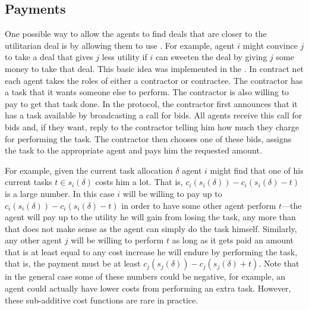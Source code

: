 \subsection{Payments}
\label{sec:payments}

One possible way to allow the agents to find deals that are closer to
the utilitarian deal is by allowing them to use .  For example, agent $i$ might convince $j$ to take a deal
that gives $j$ less utility if $i$ can sweeten the deal by giving $j$
some money to take that deal. This basic idea was implemented in the
 \cite{smith81,davis83a}. In contract net
each agent takes the roles of either a contractor or contractee. The
contractor has a task that it wants someone else to perform. The
contractor is also willing to pay to get that task done. In the
protocol, the contractor first announces that it has a task available
by broadcasting a call for bids. All agents receive this call for bids
and, if they want, reply to the contractor telling him how much they
charge for performing the task. The contractor then chooses one of
these bids, assigns the task to the appropriate agent and pays him the
requested amount.

For example, given the current task allocation $\delta$ agent $i$
might find that one of his current tasks $t \in s_i(\delta)$ costs him
a lot. That is, $c_i(s_i(\delta)) - c_i(s_i(\delta) - t)$ is a large
number. In this case $i$ will be willing to pay up to
$c_i(s_i(\delta)) - c_i(s_i(\delta) - t)$ in order to have some other
agent perform $t$---the agent will pay up to the utility he will gain
from losing the task, any more than that does not make sense as the
agent can simply do the task himself. Similarly, any other agent $j$
will be willing to perform $t$ as long as it gets paid an amount that
is at least equal to any cost increase he will endure by performing
the task, that is, the payment must be at least $c_j(s_j(\delta)) -
c_j(s_j(\delta) + t)$. Note that in the general case some of these
numbers could be negative, for example, an agent could actually have
lower costs from performing an extra task. However, these sub-additive
cost functions are rare in practice.


